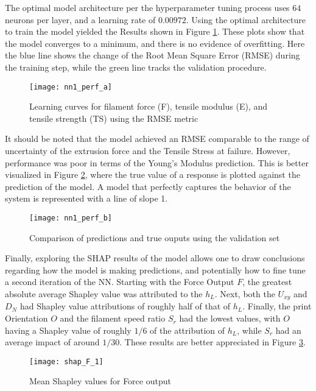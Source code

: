 \documentclass[main.tex]{subfiles}
\begin{document}
The optimal model architecture per the hyperparameter tuning process uses $64$ neurons per layer, and a learning rate of $0.00972$. Using the optimal architecture to train the model yielded the Results shown in Figure \ref{fig:nn1_p_a}. These plots show that the model converges to a minimum, and there is no evidence of overfitting. Here the blue line shows the change of the Root Mean Square Error (RMSE) during the training step, while the green line tracks the validation procedure. 

\begin{figure}[!htbp]
	\center
	\texttt{[image: nn1\_perf\_a]}
	\caption{Learning curves for filament force (F), tensile modulus (E), and tensile strength (TS) using the RMSE metric} \label{fig:nn1_p_a}
\end{figure}

It should be noted that the model achieved an RMSE comparable to the range of uncertainty of the extrusion force and the Tensile Stress at failure. However, performance was poor in terms of the Young's Modulus prediction. This is better visualized in Figure \ref{fig:nn1_p_b}, where the true value of a response is plotted against the prediction of the model. A model that perfectly captures the behavior of the system is represented with a line of slope 1.

\begin{figure}[!htbp]
	\center
	\texttt{[image: nn1\_perf\_b]}
	\caption{Comparison of predictions and true ouputs using the validation set} \label{fig:nn1_p_b}
\end{figure}

Finally, exploring the SHAP results of the model allows one to draw conclusions regarding how the model is making predictions, and potentially how to fine tune a second iteration of the NN. Starting with the Force Output $F$, the greatest absolute average Shapley value was attributed to the $h_{L}$. Next, both the $U_{xy}$ and $D_{N}$ had Shapley value attributions of roughly half of that of $h_{L}$. Finally, the print Orientation $O$ and the filament speed ratio $S_r$ had the lowest values, with $O$ having a Shapley value of roughly $1/6$ of the attribution of $h_{L}$, while $S_r$ had an average impact of around $1/30$. These results are better appreciated in Figure \ref{fig:nn1_shapF}. 

\begin{figure}[!htbp]
	\center
	\texttt{[image: shap\_F\_1]}
	\caption{Mean Shapley values for Force output} \label{fig:nn1_shapF}
\end{figure}
\end{document}
